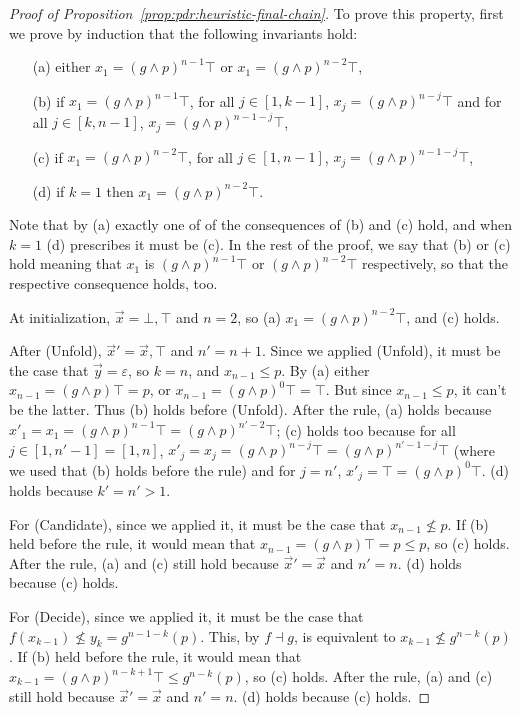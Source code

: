 \begin{proof}[Proof of Proposition~\ref{prop:pdr:heuristic-final-chain}]
	To prove this property, first we prove by induction that the following invariants hold:
	\begin{itemize}
		\item[(a)] either $x_1 = (g \land p)^{n-1} \top$ or $x_1 = (g \land p)^{n-2} \top$,
		\item[(b)] if $x_1 = (g \land p)^{n-1} \top$, for all $j \in [1, k-1]$, $x_j = (g \land p)^{n-j} \top$ and for all $j \in [k, n-1]$, $x_j = (g \land p)^{n-1-j} \top$,
		\item[(c)] if $x_1 = (g \land p)^{n-2} \top$, for all $j \in [1, n-1]$, $x_j = (g \land p)^{n-1-j} \top$,
		\item[(d)] if $k = 1$ then $x_1 = (g \land p)^{n-2} \top$.
	\end{itemize}
	Note that by (a) exactly one of of the consequences of (b) and (c) hold, and when $k = 1$ (d) prescribes it must be (c). In the rest of the proof, we say that (b) or (c) hold meaning that $x_1$ is $(g \land p)^{n-1} \top$ or $(g \land p)^{n-2} \top$ respectively, so that the respective consequence holds, too.

	At initialization, $\vec{x} = \bot, \top$ and $n = 2$, so (a) $x_1 = (g \land p)^{n-2} \top$, and (c) holds.

	After (Unfold), $\vec{x}' =  \vec{x}, \top$ and $n' = n+1$. Since we applied (Unfold), it must be the case that $\vec{y} = \varepsilon$, so $k = n$, and $x_{n-1} \leq p$. By (a) either $x_{n-1} = (g \land p) \top = p$, or $x_{n-1} = (g \land p)^{0} \top = \top$. But since $x_{n-1} \leq p$, it can't be the latter. Thus (b) holds before (Unfold).
	After the rule, (a) holds because $x'_1 = x_1 = (g \land p)^{n-1} \top = (g \land p)^{n'-2} \top$; (c) holds too because for all $j \in [1, n'-1] = [1, n]$, $x'_j = x_j = (g \land p)^{n-j} \top = (g \land p)^{n'-1-j} \top$ (where we used that (b) holds before the rule) and for $j = n'$, $x'_j = \top = (g \land p)^0 \top$. (d) holds because $k' = n' > 1$.

	For (Candidate), since we applied it, it must be the case that $x_{n-1} \not\leq p$. If (b) held before the rule, it would mean that $x_{n-1} = (g \land p) \top = p \leq p$, so (c) holds.
	After the rule, (a) and (c) still hold because $\vec{x}' = \vec{x}$ and $n' = n$. (d) holds because (c) holds.

	For (Decide), since we applied it, it must be the case that $f (x_{k-1}) \not\leq y_k = g^{n-1-k} (p)$. This, by $f \dashv g$, is equivalent to $x_{k-1} \not\leq g^{n-k} (p)$. If (b) held before the rule, it would mean that $x_{k-1} = (g \land p)^{n-k+1} \top \leq g^{n-k} (p)$, so (c) holds.
	After the rule, (a) and (c) still hold because $\vec{x}' = \vec{x}$ and $n' = n$. (d) holds because (c) holds.


\end{proof}
